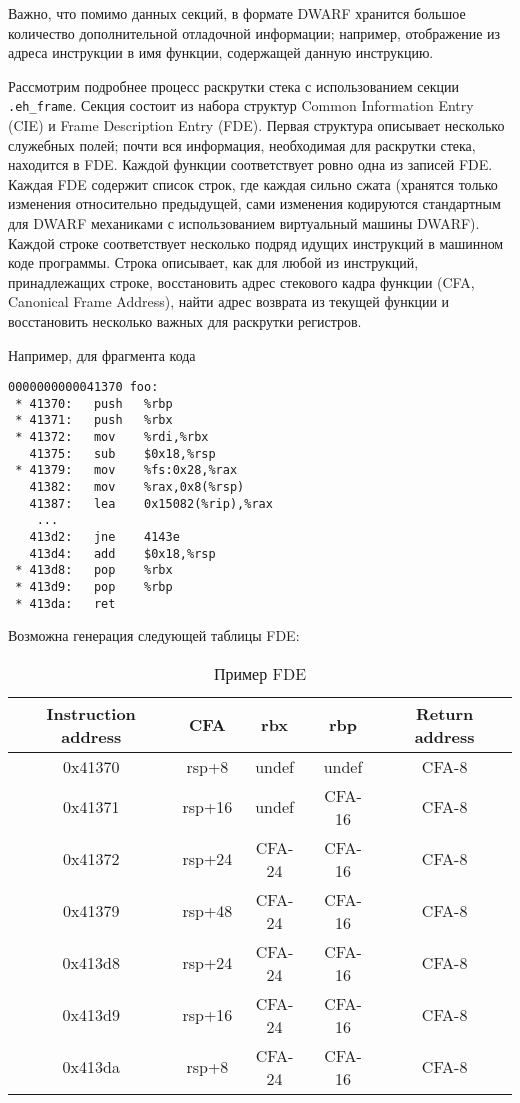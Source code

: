 Важно, что помимо данных секций, в формате DWARF хранится большое количество дополнительной отладочной информации;
например, отображение из адреса инструкции в имя функции, содержащей данную инструкцию.

Рассмотрим подробнее процесс раскрутки стека с использованием секции \verb!.eh_frame!.
Секция состоит из набора структур Common Information Entry (CIE) и Frame Description Entry (FDE).
Первая структура описывает несколько служебных полей; почти вся информация, необходимая для раскрутки стека, находится в FDE.
Каждой функции соответствует ровно одна из записей FDE.
Каждая FDE содержит список строк, где каждая сильно сжата (хранятся только изменения относительно предыдущей, сами изменения кодируются
стандартным для DWARF механиками с использованием виртуальный машины DWARF).
Каждой строке соответствует несколько подряд идущих инструкций в машинном коде программы. Строка описывает, как для любой из инструкций,
принадлежащих строке, восстановить адрес стекового кадра функции (CFA, Canonical Frame Address),
найти адрес возврата из текущей функции и восстановить несколько важных для раскрутки регистров.

Например, для фрагмента кода
\begin{verbatim}
0000000000041370 foo:
 * 41370:	push   %rbp
 * 41371:	push   %rbx
 * 41372:	mov    %rdi,%rbx
   41375:	sub    $0x18,%rsp
 * 41379:	mov    %fs:0x28,%rax
   41382:	mov    %rax,0x8(%rsp)
   41387:	lea    0x15082(%rip),%rax
    ...
   413d2:	jne    4143e
   413d4:	add    $0x18,%rsp
 * 413d8:	pop    %rbx
 * 413d9:	pop    %rbp
 * 413da:	ret
\end{verbatim}

Возможна генерация следующей таблицы FDE:
\begin{table}[H]
\begin{center}
\begin{tabular}{ |c||c|c|c|c| } 
 \hline
Instruction address   & CFA    & rbx    & rbp    & Return address \\
 \hline
0x41370 & rsp+8  & undef  & undef  & CFA-8 \\
0x41371 & rsp+16 & undef  & CFA-16 & CFA-8 \\
0x41372 & rsp+24 & CFA-24 & CFA-16 & CFA-8 \\
0x41379 & rsp+48 & CFA-24 & CFA-16 & CFA-8 \\
0x413d8 & rsp+24 & CFA-24 & CFA-16 & CFA-8 \\
0x413d9 & rsp+16 & CFA-24 & CFA-16 & CFA-8 \\
0x413da & rsp+8  & CFA-24 & CFA-16 & CFA-8 \\
 \hline
\end{tabular}
\end{center}
\caption{Пример FDE}
\end{table}

